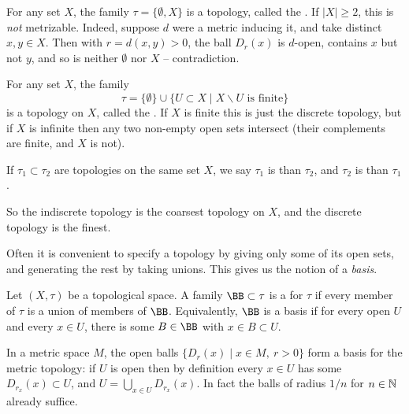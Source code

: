 \documentclass[a4paper]{scrartcl}
\begin{document}
\begin{example}
    For any set $X$, the family $\tau = \{\emptyset, X\}$ is a topology, called the . If $|X| \geq 2$, this is \emph{not} metrizable. Indeed, suppose $d$ were a metric inducing it, and take distinct $x, y \in X$. Then with $r = d(x, y) > 0$, the ball $D_r(x)$ is $d$-open, contains $x$ but not $y$, and so is neither $\emptyset$ nor $X$ -- contradiction.
\end{example}

\begin{example}
    For any set $X$, the family
    $$
    \tau = \{\emptyset\} \cup \{U \subset X \mid X \backslash U \text{ is finite}\}
    $$
    is a topology on $X$, called the . If $X$ is finite this is just the discrete topology, but if $X$ is infinite then any two non-empty open sets intersect (their complements are finite, and $X$ is not).
\end{example}

\begin{definition}
    If $\tau_1 \subset \tau_2$ are topologies on the same set $X$, we say $\tau_1$ is  than $\tau_2$, and $\tau_2$ is  than $\tau_1$.
\end{definition}

So the indiscrete topology is the coarsest topology on $X$, and the discrete topology is the finest.

Often it is convenient to specify a topology by giving only some of its open sets, and generating the rest by taking unions. This gives us the notion of a \emph{basis}.

\begin{definition}[Basis]
    Let $(X, \tau)$ be a topological space. A family $\BB \subset \tau$ is a  for $\tau$ if every member of $\tau$ is a union of members of $\BB$. Equivalently, $\BB$ is a basis if for every open $U$ and every $x \in U$, there is some $B \in \BB$ with $x \in B \subset U$.
\end{definition}

\begin{example}
    In a metric space $M$, the open balls $\{D_r(x) \mid x \in M,\ r > 0\}$ form a basis for the metric topology: if $U$ is open then by definition every $x \in U$ has some $D_{r_x}(x) \subset U$, and $U = \bigcup_{x \in U} D_{r_x}(x)$. In fact the balls of radius $1/n$ for $n \in \mathbb{N}$ already suffice.
\end{example}
\end{document}
